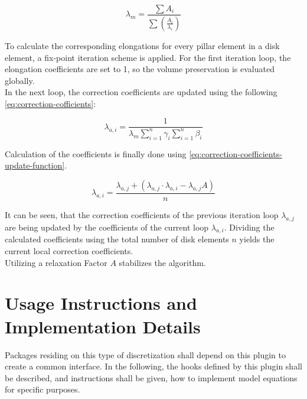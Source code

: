 \documentclass[11pt]{PyRollDocs}
\begin{document}
    \begin{equation}
        \lambda_{m} = \frac{\sum A_{i}}{\sum \left( \frac{A_{i}}{\lambda_i} \right)}
        \label{eq:elongation-correction}
    \end{equation}

    To calculate the corresponding elongations for every pillar element in a disk element, a fix-point iteration scheme is applied.
    For the first iteration loop, the elongation coefficients are set to 1, so the volume preservation is evaluated globally.\\
    In the next loop, the correction coefficients are updated using the following \autoref{eq:correction-cofficients}:

    \begin{equation}
        \lambda_{a, i} = \frac{1}{\lambda_{m} \sum_{i=1}^{n} \gamma_{i} \sum_{i=1}^{n} \beta_{i} }
        \label{eq:correction-cofficients}
    \end{equation}

    Calculation of the coefficients is finally done using \autoref{eq:correction-coefficients-update-function}.

    \begin{equation}
        \lambda_{a, i} = \frac{\lambda_{a, j} +  \left( \lambda_{a, j} \cdot \lambda_{a, i} - \lambda_{a, j} A \right)}{n}
        \label{eq:correction-coefficients-update-function}
    \end{equation}

    It can be seen, that the correction coefficients of the previous iteration loop $\lambda_{a, j}$ are being updated by the coefficients of the current loop $\lambda_{a, i}$.
    Dividing the calculated coefficients using the total number of disk elements $n$ yields the current local correction coefficients.\\
    Utilizing a relaxation Factor $A$ stabilizes the algorithm.


    \section{Usage Instructions and Implementation Details}\label{sec:usage-instructions}

    Packages residing on this type of discretization shall depend on this plugin to create a common interface.
    In the following, the hooks defined by this plugin shall be described, and instructions shall be given, how to implement model equations for specific purposes.
\end{document}

